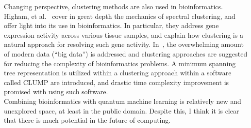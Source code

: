 \documentclass{article}
\begin{document}
  Changing perspective, clustering methods are also used in bioinformatics. Higham, et al.~\cite{higham} cover in great depth the mechanics of spectral clustering, and offer light into its use in bioinformatics. In particular, they address gene expression activity across various tissue samples, and explain how clustering is a natural approach for resolving such gene activity. In~\cite{olman}, the overwhelming amount of modern data (``big data'') is addressed and clustering approaches are suggested for reducing the complexity of bioinformatics problems. A minimum spanning tree representation is utilized within a clustering approach within a software called CLUMP are introduced, and drastic time complexity improvement is promised with using such software. \\

  Combining bioinformatics with quantum machine learning is relatively new and unexplored space, at least in the public domain. Despite this, I think it is clear that there is much potential in the future of computing.


\raggedright

\end{document}
